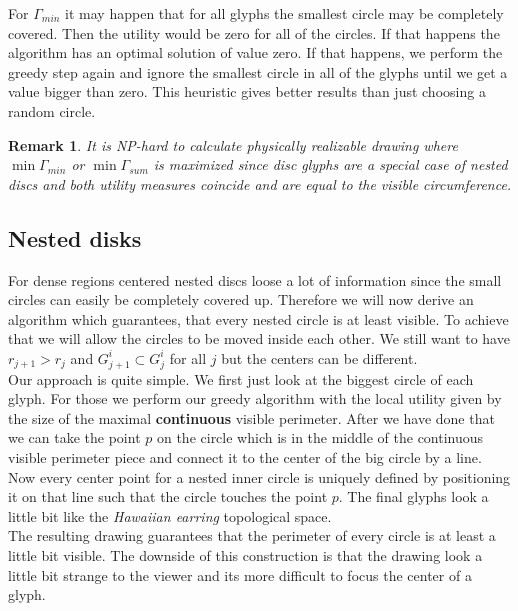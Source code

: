 \documentclass[a4paper,11pt]{article}
\newtheorem*{remark}{Remark}
\begin{document}
For $\Gamma_{min}$ it may happen that for all glyphs the smallest circle may be completely covered. Then the utility would be zero for all of the circles. If that happens the algorithm has an optimal solution of value zero. If that happens, we perform the greedy step again and ignore the smallest circle in all of the glyphs until we get a value bigger than zero. This heuristic gives better results than just choosing a random circle.\\
%
\begin{remark}
  It is NP-hard to calculate physically realizable drawing where $\min\Gamma_{min}$ or $\min\Gamma_{sum}$ is maximized since disc glyphs are a special case of nested discs and both utility measures coincide and are equal to the visible circumference.
\end{remark}
%

\subsection{Nested disks}

For dense regions centered nested discs loose a lot of information since the small circles can easily be completely covered up. Therefore we will now derive an algorithm which guarantees, that every nested circle is at least visible. To achieve that we will allow the circles to be moved inside each other. We still want to have $r_{j+1}>r_j$ and $G^i_{j+1}\subset G^i_j$ for all $j$ but the centers can be different.\\

Our approach is quite simple. We first just look at the biggest circle of each glyph. For those we perform our greedy algorithm with the local utility given by the size of the maximal \textbf{continuous} visible perimeter. After we have done that we can take the point $p$ on the circle which is in the middle of the continuous visible perimeter piece and connect it to the center of the big circle by a line. Now every center point for a nested inner circle is uniquely defined by positioning it on that line such that the circle touches the point $p$. The final glyphs look a little bit like the \textit{Hawaiian earring} topological space.\\

The resulting drawing guarantees that the perimeter of every circle is at least a little bit visible. The downside of this construction is that the drawing look a little bit strange to the viewer and its more difficult to focus the center of a glyph.
\end{document}
